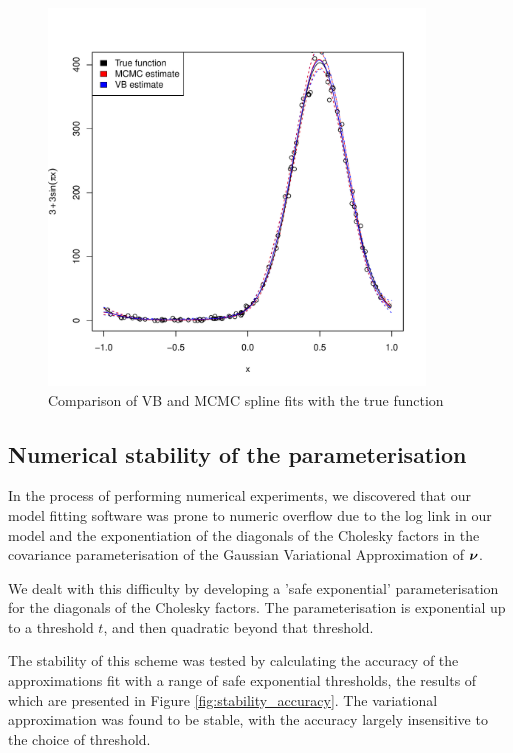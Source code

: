 			\begin{figure}
				\label{fig:spline}
				\caption{Comparison of VB and MCMC spline fits with the true function}
				\includegraphics[width=100mm, height=100mm]{code/results/accuracy_plots_spline_gva2.pdf}
			\end{figure}
					
					
			\subsection{Numerical stability of the parameterisation}
			
			In the process of performing numerical experiments, we discovered that our model fitting software was 
			prone to numeric overflow due to the log link in our model and the exponentiation of the diagonals of the
			Cholesky factors in the covariance parameterisation of the Gaussian Variational Approximation of ${\boldsymbol \nu}$.
			
			We dealt with this difficulty by developing a 'safe exponential' parameterisation for the diagonals of the
			Cholesky factors. The parameterisation is exponential up to a threshold $t$, and then quadratic beyond that
			threshold.
			
			The stability of this scheme was tested by calculating the accuracy of the approximations fit with a range
			of safe exponential thresholds, the results of which are presented in Figure \ref{fig:stability_accuracy}.
			The variational approximation was found to be stable, with the accuracy largely insensitive to the choice of
			threshold.
			
